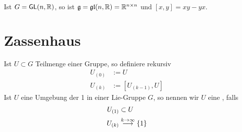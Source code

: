 \documentclass{book}
\newcommand{\g}{\mathfrak{g}}
\newcommand{\GL}{\textsf{GL}(n,\R)}
\newcommand{\glf}{\mathfrak{gl}(n,\R)}
\begin{document}
\Bem{}
Ist $G = \GL$, so ist $\g = \glf = \R^{n\times n}$ und $[x,y] = xy -yx$. 



\section{Zassenhaus}
\Def{}
Ist $U \subset G$ Teilmenge einer Gruppe, so definiere rekursiv
\begin{align*}
U_{(0)} &:= U\\
U_{(k)} &:= [U_{(k-1)}, U]
\end{align*}
Ist $U$ eine Umgebung der 1 in einer Lie-Gruppe $G$, so nennen wir $U$ eine , falls
\begin{align*}
U_{(1)} &\subset U\\
U_{(k)} &\overset{k \overset{{}}{\rightarrow} \infty}{\longrightarrow} \{1\}
\end{align*}
\end{document}

